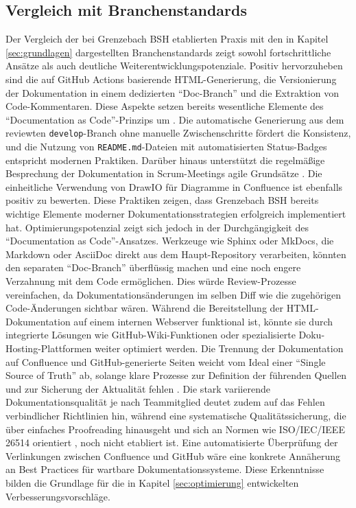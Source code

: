 \documentclass[12pt,oneside]{article}
\begin{document}
    \subsection{Vergleich mit Branchenstandards}
    \label{subsec:vergleich_dok}
    Der Vergleich der bei Grenzebach BSH etablierten Praxis mit den in Kapitel \ref{sec:grundlagen} dargestellten Branchenstandards zeigt sowohl fortschrittliche Ansätze als auch deutliche Weiterentwicklungspotenziale.
    \newline
    Positiv hervorzuheben sind die auf GitHub Actions basierende HTML-Generierung, die Versionierung der Dokumentation in einem dedizierten ``Doc-Branch'' und die Extraktion von Code-Kommentaren. Diese Aspekte setzen bereits wesentliche Elemente des ``Documentation as Code''-Prinzips um \cite{WriteTheDocsWhatIsDocsAsCode}. Die automatische Generierung aus dem reviewten \texttt{develop}-Branch ohne manuelle Zwischenschritte fördert die Konsistenz, und die Nutzung von \texttt{README.md}-Dateien mit automatisierten Status-Badges entspricht modernen Praktiken. Darüber hinaus unterstützt die regelmäßige Besprechung der Dokumentation in Scrum-Meetings agile Grundsätze \cite{AgileManifestoDe, fraunhoferIESE2020agilMytho}. Die einheitliche Verwendung von DrawIO für Diagramme in Confluence ist ebenfalls positiv zu bewerten. Diese Praktiken zeigen, dass Grenzebach BSH bereits wichtige Elemente moderner Dokumentationsstrategien erfolgreich implementiert hat.
    \newline
    Optimierungspotenzial zeigt sich jedoch in der Durchgängigkeit des ``Documentation as Code''-Ansatzes. Werkzeuge wie Sphinx oder MkDocs, die Markdown oder AsciiDoc direkt aus dem Haupt-Repository verarbeiten, könnten den separaten ``Doc-Branch'' überflüssig machen und eine noch engere Verzahnung mit dem Code ermöglichen. Dies würde Review-Prozesse vereinfachen, da Dokumentationsänderungen im selben Diff wie die zugehörigen Code-Änderungen sichtbar wären. Während die Bereitstellung der HTML-Dokumentation auf einem internen Webserver funktional ist, könnte sie durch integrierte Lösungen wie GitHub-Wiki-Funktionen oder spezialisierte Doku-Hosting-Plattformen weiter optimiert werden.
    \newline
    Die Trennung der Dokumentation auf Confluence und GitHub-generierte Seiten weicht vom Ideal einer ``Single Source of Truth'' ab, solange klare Prozesse zur Definition der führenden Quellen und zur Sicherung der Aktualität fehlen \cite{webmakers2024}. Die stark variierende Dokumentationsqualität je nach Teammitglied deutet zudem auf das Fehlen verbindlicher Richtlinien hin, während eine systematische Qualitätssicherung, die über einfaches Proofreading hinausgeht und sich an Normen wie ISO/IEC/IEEE 26514 orientiert \cite{styrz2022normen}, noch nicht etabliert ist. Eine automatisierte Überprüfung der Verlinkungen zwischen Confluence und GitHub wäre eine konkrete Annäherung an Best Practices für wartbare Dokumentationssysteme. Diese Erkenntnisse bilden die Grundlage für die in Kapitel \ref{sec:optimierung} entwickelten Verbesserungsvorschläge.
\end{document}
